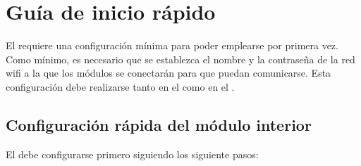 \section{Guía de inicio rápido}
\label{sec:inicio-rapido}

El \CMS requiere una configuración mínima para poder emplearse por primera vez.
Como mínimo, es necesario que se establezca el nombre y la contraseña de la red wifi a la que los módulos se conectarán para que puedan comunicarse.
Esta configuración debe realizarse tanto en el \MIE como en el \MEE.

\subsection{Configuración rápida del módulo interior}

El \MIE debe configurarse primero siguiendo los siguiente pasos:

